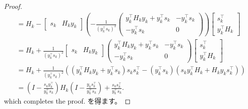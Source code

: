 \documentclass[0_main]{subfiles}
\begin{document}
\begin{proof}
\begin{align*}
                & = H_k- \begin{bmatrix}s_k                                                                                                                             & H_k y_k\end{bmatrix}\left(-\frac{1}{(y_k^\top s_k)^2}\begin{pmatrix}y_k^\top H_k y_k + y_k^\top s_k & -y_k^\top s_k                                                                                                                                                                                                                                         \\-y_k^\top s_k                 & 0    \end{pmatrix}\right) \begin{bmatrix} s_k^\top                                                      \\     y_k^\top H_k\end{bmatrix} \\
                & = H_k+\frac{1}{(y_k^\top s_k)^2}\begin{bmatrix}s_k                                                                                                    & H_k y_k\end{bmatrix} \begin{pmatrix}y_k^\top H_k y_k + y_k^\top s_k                                & -y_k^\top s_k                                                                                                                                                                                                                                         \\-y_k^\top s_k                 & 0\end{pmatrix} \begin{bmatrix}s_k^\top                                                             \\    y_k^\top H_k\end{bmatrix}        \\
                & = H_k+\frac{1}{(y_k^\top s_k)^2} \left((y_k^\top H_k y_k + y_k^\top s_k) s_k s_k^\top - (y_k^\top s_k)(s_k y_k^\top H_k + H_k y_k s_k^\top) \right)                                                                                                                                                                                                                                                                                                                                                                                                                                                                                                                                            \\
                & = \left(I - \frac{s_k y_k^\top}{y_k^\top s_k}\right) H_k \left(I - \frac{y_k s_k^\top}{y_k^\top s_k}\right) + \frac{s_k s_k^\top}{y_k^\top s_k}.
    \end{align*}
    \ifEn
        which completes the proof.
    \else
        を得ます。
    \fi
    \myQED
\end{proof}
\end{document}
